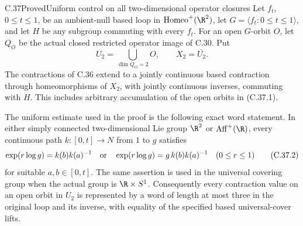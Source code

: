\begin{claim}{C.37}{Proved}{Uniform control on all two-dimensional operator closures}
Let $f_t$, $0\leq t\leq1$, be an ambient-null based loop in
$\operatorname{Homeo}^+(\R^2)$, let $G=\langle f_t:0\leq t\leq1\rangle$,
and let $H$ be any subgroup commuting with every $f_t$.
For an open $G$-orbit $O$, let $Q_O$ be the actual closed restricted
operator image of C.30. Put
\[
 U_2=\bigcup_{\dim Q_O=2}O,\qquad X_2=\overline{U_2}.
                                                        \tag{C.37.1}
\]
The contractions of C.36 extend to a jointly continuous based
contraction through homeomorphisms of $X_2$, with jointly continuous
inverses, commuting with $H$. This includes arbitrary accumulation
of the open orbits in (C.37.1).

The uniform estimate used in the proof is the following exact
word statement. In either simply connected two-dimensional Lie
group $\R^2$ or $\operatorname{Aff}^+(\R)$, every continuous path
$k:[0,t]\to N$ from $1$ to $g$ satisfies
\[
 \exp(r\log g)
   =k(b)k(a)^{-1}
 \quad\hbox{or}\quad
 \exp(r\log g)=g\,k(b)k(a)^{-1}
 \quad(0\leq r\leq1)                                   \tag{C.37.2}
\]
for suitable $a,b\in[0,t]$. The same assertion is used in the
universal covering group when the actual group is $\R\times S^1$.
Consequently every contraction value on an open orbit in $U_2$
is represented by a word of length at most three in the original
loop and its inverse, with equality of the specified based
universal-cover lifts.
\end{claim}


